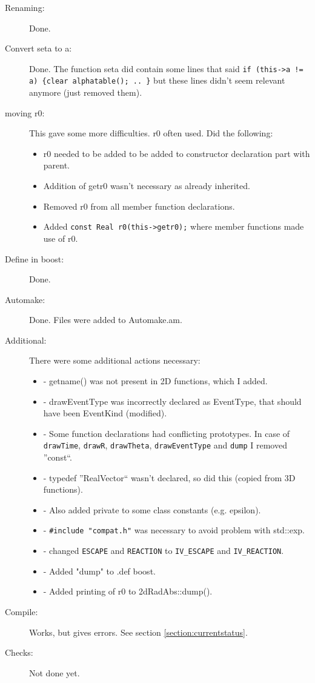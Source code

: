 \documentclass[a4paper,10pt]{article}
\begin{document}
\begin{description}
 \item[Renaming:] Done.
 \item[Convert seta to a:] Done. The function seta did contain some lines that said \verb|if (this->a != a) {clear alphatable(); .. }| but these lines didn't seem relevant anymore (just removed them).
 \item[moving r0:] This gave some more difficulties. r0 often used. Did the following:
    \begin{itemize}     
      \item r0 needed to be added to be added to constructor declaration part with parent.
      \item Addition of getr0 wasn't necessary as already inherited.
      \item Removed r0 from all member function declarations.
      \item Added \verb|const Real r0(this->getr0);| where member functions made use of r0.
    \end{itemize}
 \item[Define in boost:] Done.
 \item[Automake:] Done. Files were added to Automake.am.
 \item[Additional:] There were some additional actions necessary: 
  \begin{itemize}     
    \item - getname() was not present in 2D functions, which I added.
    \item - drawEventType was incorrectly declared as EventType, that should have been EventKind (modified).
    \item - Some function declarations had conflicting prototypes. In case of \verb|drawTime|, \verb|drawR|, \verb|drawTheta|, \verb|drawEventType| and \verb|dump| I removed ''const``.
    \item - typedef ''RealVector`` wasn't declared, so did this (copied from 3D functions).
    \item - Also added private to some class constants (e.g. epsilon).
    \item - \verb|#include "compat.h"| was necessary to avoid problem with std::exp.
    \item - changed \verb|ESCAPE| and \verb|REACTION| to \verb|IV_ESCAPE| and \verb|IV_REACTION|.
    \item - Added "dump" to .def boost.
    \item - Added printing of r0 to 2dRadAbs::dump().
  \end{itemize}
 \item[Compile:] Works, but gives errors. See section \ref{section:currentstatus}.
 \item[Checks:] Not done yet.
\end{description}
\end{document}
